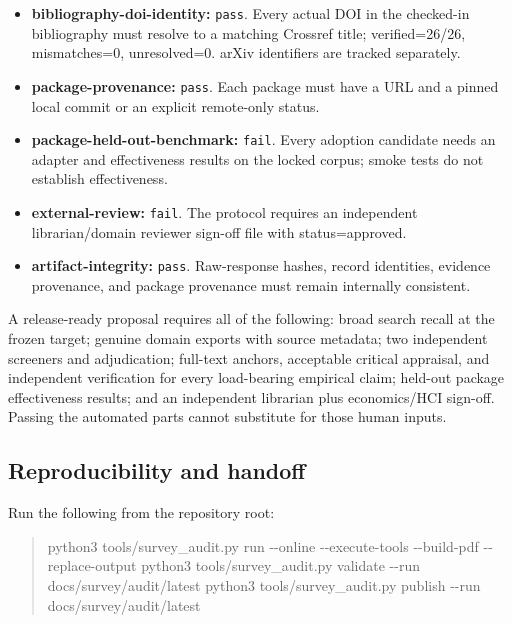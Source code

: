 \documentclass[11pt]{article}
\newenvironment{Shaded}{\begin{quote}\small}{\end{quote}}
\newcommand{\NormalTok}[1]{#1}
\newcommand{\ExtensionTok}[1]{#1}
\begin{document}
\begin{itemize}
\item
  \textbf{bibliography-doi-identity:} \texttt{pass}. Every actual DOI in the checked-in bibliography must resolve to a matching Crossref title; verified=26/26, mismatches=0, unresolved=0. arXiv identifiers are tracked separately.
\item
  \textbf{package-provenance:} \texttt{pass}. Each package must have a URL and a pinned local commit or an explicit remote-only status.
\item
  \textbf{package-held-out-benchmark:} \texttt{fail}. Every adoption candidate needs an adapter and effectiveness results on the locked corpus; smoke tests do not establish effectiveness.
\item
  \textbf{external-review:} \texttt{fail}. The protocol requires an independent librarian/domain reviewer sign-off file with status=approved.
\item
  \textbf{artifact-integrity:} \texttt{pass}. Raw-response hashes, record identities, evidence provenance, and package provenance must remain internally consistent.
\end{itemize}

A release-ready proposal requires all of the following: broad search recall at the frozen target; genuine domain exports with source metadata; two independent screeners and adjudication; full-text anchors, acceptable critical appraisal, and independent verification for every load-bearing empirical claim; held-out package effectiveness results; and an independent librarian plus economics/HCI sign-off. Passing the automated parts cannot substitute for those human inputs.

\hypertarget{reproducibility-and-handoff}{%
\subsection{Reproducibility and handoff}\label{reproducibility-and-handoff}}

Run the following from the repository root:

\begin{Shaded}
\begin{Highlighting}[]
\ExtensionTok{python3}\NormalTok{ tools/survey\_audit.py run {-}{-}online {-}{-}execute{-}tools {-}{-}build{-}pdf {-}{-}replace{-}output}
\ExtensionTok{python3}\NormalTok{ tools/survey\_audit.py validate {-}{-}run docs/survey/audit/latest}
\ExtensionTok{python3}\NormalTok{ tools/survey\_audit.py publish {-}{-}run docs/survey/audit/latest}
\end{Highlighting}
\end{Shaded}
\end{document}
